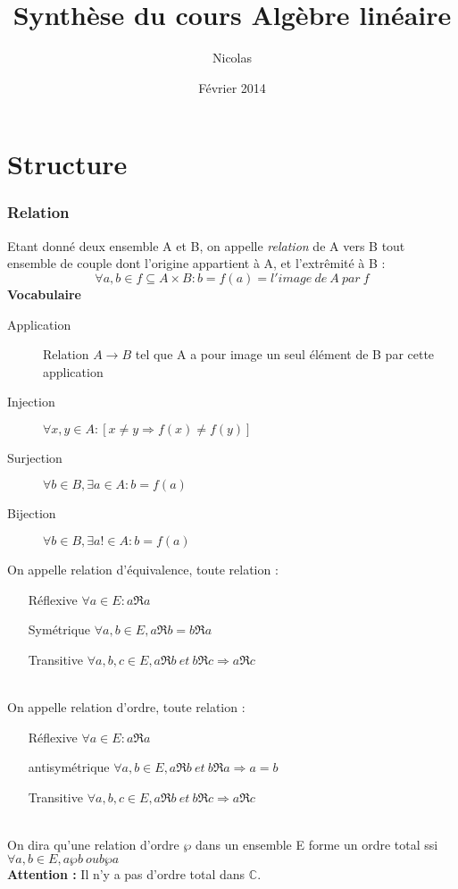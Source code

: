\documentclass[12pt, a4paper]{article}
\author{Nicolas \bsc{Englebert}}
\title{Synthèse du cours Algèbre linéaire}
\date{Février 2014}
\begin{document}
\renewcommand{\proofname}{Démonstration}
\newcommand{\pscal}[2]{\left\langle {#1} , {#2} \right\rangle} 
\maketitle
\tableofcontents
\newpage

\section{Structure}
\subsubsection{Relation}
Etant donné deux ensemble A et B, on appelle \textit{relation} de A vers B tout ensemble de couple dont l'origine appartient à A, et l'extrêmité à B :
$$ \forall a, b \in f \subseteq A \times B : b =f(a) = l'image\ de\ A\ par\ f$$
\textbf{Vocabulaire}\\
\begin{description}
\item[Application] Relation $A \longrightarrow B$ tel que A a pour image un seul élément de B par cette application
\item[Injection] $\forall x,y \in A : [x \neq y \Rightarrow f(x) \neq f(y)]$
\item[Surjection] $\forall b \in B, \exists a \in A : b = f(a)$
\item[Bijection] $\forall b \in B, \exists a! \in A : b = f(a)$
\end{description}
On appelle relation d'équivalence, toute relation :
\begin{itemize}
\item[Réflexive] $\forall a \in E : a \Re a$
\item[Symétrique] $\forall a, b \in E, a \Re b = b \Re a$
\item[Transitive] $\forall a, b, c \in E, a \Re b\ et\ b \Re c \Rightarrow a \Re c$
\end{itemize}
\ \ \\
On appelle relation d'ordre, toute relation :
\begin{itemize}
\item[Réflexive] $\forall a \in E : a \Re a$
\item[antisymétrique] $\forall a, b \in E, a \Re b\ et\ b \Re a \Rightarrow a = b$
\item[Transitive] $\forall a, b, c \in E, a \Re b\ et\ b \Re c \Rightarrow a \Re c$
\end{itemize}\ \\
On dira qu'une relation d'ordre $\wp$ dans un ensemble E forme un ordre total ssi $\forall a, b \in E, a \wp b\ ou b \wp a$\\
\textbf{Attention :} Il n'y a pas d'ordre total dans $\mathbb{C}$.
\end{document}
